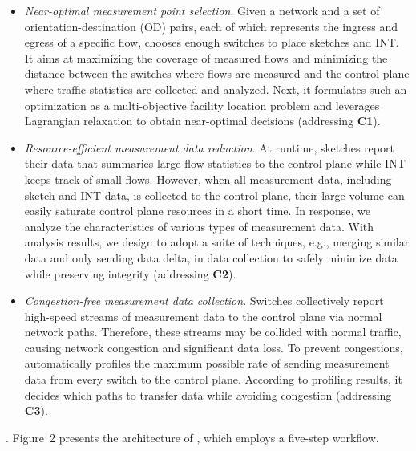 \begin{itemize}[leftmargin=*]
%
    \item \emph{Near-optimal measurement point selection}. Given a network and a set of orientation-destination (OD) pairs, each of which represents the ingress and egress of a specific flow, \sysname chooses enough switches to place sketches and INT. It aims at maximizing the coverage of measured flows and minimizing the distance between the switches where flows are measured and the control plane where traffic statistics are collected and analyzed. Next, it formulates such an optimization as a multi-objective facility location problem and leverages Lagrangian relaxation to obtain near-optimal decisions (addressing \textbf{C1}). 
%
    \item \emph{Resource-efficient measurement data reduction}. At runtime, sketches report their data that summaries large flow statistics to the control plane while INT keeps track of small flows. However, when all measurement data, including sketch and INT data, is collected to the control plane, their large volume can easily saturate control plane resources in a short time. In response, we analyze the characteristics of various types of measurement data. With analysis results, we design \sysname to adopt a suite of techniques, e.g., merging similar data and only sending data delta, in data collection to safely minimize data while preserving integrity (addressing \textbf{C2}). 
%
    \item \emph{Congestion-free measurement data collection}. Switches collectively report high-speed streams of measurement data to the control plane via normal network paths. Therefore, these streams may be collided with normal traffic, causing network congestion and significant data loss. To prevent congestions, \sysname automatically profiles the maximum possible rate of sending measurement data from every switch to the control plane. According to profiling results, it decides which paths to transfer data while avoiding congestion (addressing \textbf{C3}). 
%
\end{itemize}

. Figure~2 presents the architecture of \sysname, which employs a five-step workflow. 

